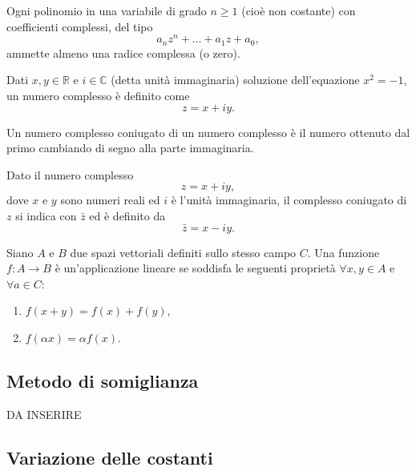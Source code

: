 \begin{theorem}\label{th:fondamentale_algebra}
   Ogni polinomio in una variabile di grado $n\geq 1$ (cioè non costante) con coefficienti complessi, del tipo
    \begin{equation*}
        a_{n}z^{n}+\ldots +a_{1}z+a_{0},
    \end{equation*}
    ammette almeno una radice complessa (o zero). 
\end{theorem}
\begin{definition}
    Dati $x,y\in\mathbb R$ e $i\in\mathbb C$ (detta unità immaginaria) soluzione dell'equazione $x^2=-1$, un numero complesso è definito come
    \begin{equation*}
        z=x+iy.
    \end{equation*}
\end{definition}
Un numero complesso coniugato di un numero complesso è il numero ottenuto dal primo cambiando di segno alla parte immaginaria.
\begin{definition}\label{def:complesso_coniugato}
    Dato il numero complesso
    \begin{equation*}
        z = x + i y,
    \end{equation*}
    dove $x$ e $y$ sono numeri reali ed $i$ è l'unità immaginaria, il complesso coniugato di $z$ si indica con $\bar {z}$ ed è definito da
    \begin{equation*}
        \bar {z}=x-iy.
    \end{equation*}
\end{definition}

\begin{definition}\label{def:applicazione_lineare}
	Siano $A$ e $B$ due spazi vettoriali definiti sullo stesso campo $C$. Una funzione $f:A\rightarrow B$ è un'\gls{applicazione lineare} se soddisfa le seguenti proprietà $\forall x,y\in A$ e $\forall a\in C$:
	\begin{enumerate}
		\item $f(x+y)=f(x)+f(y),$
		\item $f(\alpha x)=\alpha f(x)$.
	\end{enumerate}
\end{definition}

\subsection{Metodo di somiglianza}\label{ssec:metodo_somiglianza}
DA INSERIRE

\subsection{Variazione delle costanti}\label{ssec:variazione_costanti}